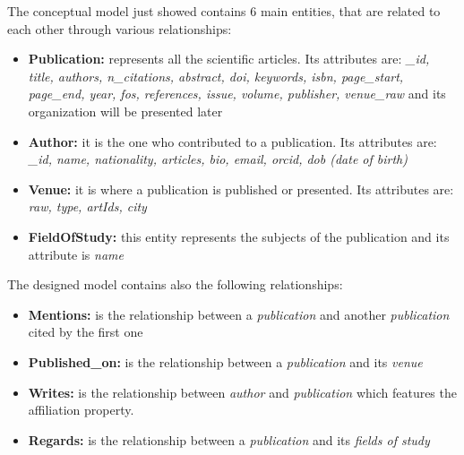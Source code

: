 \documentclass{Configuration_Files/PoliMi3i_thesis}
\begin{document}
The conceptual model just showed contains 6 main entities, that are related to each other through various relationships:
\begin{itemize}
    \item \textbf{Publication:} represents all the scientific articles. Its attributes are: \emph{\_id, title, authors, n\_citations,
        abstract, doi, keywords, isbn, page\_start, page\_end, year, fos, references, issue, volume, publisher, venue\_raw} and its
        organization will be presented later
    \item \textbf{Author:} it is the one who contributed to a publication. Its attributes are: \emph{\_id, name, nationality, articles,
        bio, email, orcid, dob (date of birth)}
    \item \textbf{Venue:} it is where a publication is published or presented. Its attributes are: \emph{raw, type,
        artIds, city}
    \item \textbf{FieldOfStudy:} this entity represents the subjects of the publication and its attribute is \emph{name}
\end{itemize}

The designed model contains also the following relationships:
\begin{itemize}
    \item \textbf{Mentions:} is the relationship between a \emph{publication} and another \emph{publication} cited by the first one
    \item \textbf{Published\_on:} is the relationship between a \emph{publication} and its \emph{venue}
    \item \textbf{Writes:} is the relationship between \emph{author} and \emph{publication} which features the affiliation property.
    \item \textbf{Regards:} is the relationship between a \emph{publication} and its \emph{fields of study}
\end{itemize}
\end{document}
